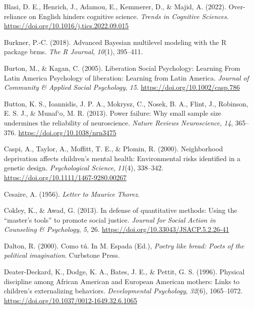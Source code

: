 \documentclass[
  letterpaper,
  DIV=11,
  numbers=noendperiod]{scrreprt}
\newlength{\cslhangindent}
\newenvironment{CSLReferences}[2] %
 {\begin{list}{}{%
  \setlength{\itemindent}{0pt}
  \setlength{\leftmargin}{0pt}
  \setlength{\parsep}{0pt}
  \ifodd #1
   \setlength{\leftmargin}{\cslhangindent}
   \setlength{\itemindent}{-1\cslhangindent}
  \fi
  \setlength{\itemsep}{#2\baselineskip}}}
 {\end{list}}
\begin{document}
\begin{CSLReferences}{1}{0}
Blasi, D. E., Henrich, J., Adamou, E., Kemmerer, D., \& Majid, A.
(2022). Over-reliance on {E}nglish hinders cognitive science.
\emph{Trends in Cognitive Sciences}.
\url{https://doi.org/10.1016/j.tics.2022.09.015}

Burkner, P.-C. (2018). Advanced {B}ayesian multilevel modeling with the
{R} package brms. \emph{The R Journal}, \emph{10}(1), 395--411.

Burton, M., \& Kagan, C. (2005). {Liberation Social Psychology: Learning
From Latin America Psychology of liberation: Learning from Latin
America}. \emph{Journal of Community \& Applied Social Psychology},
\emph{15}. \url{https://doi.org/10.1002/casp.786}

Button, K. S., Ioannidis, J. P. A., Mokrysz, C., Nosek, B. A., Flint,
J., Robinson, E. S. J., \& Munaf`o, M. R. (2013). Power failure: Why
small sample size undermines the reliability of neuroscience.
\emph{Nature Reviews Neuroscience}, \emph{14}, 365--376.
\url{https://doi.org/10.1038/nrn3475}

Caspi, A., Taylor, A., Moffitt, T. E., \& Plomin, R. (2000).
Neighborhood deprivation affects children's mental health: Environmental
risks identified in a genetic design. \emph{Psychological Science},
\emph{11}(4), 338--342. \url{https://doi.org/10.1111/1467-9280.00267}

Cesaire, A. (1956). \emph{Letter to {M}aurice {T}horez}.

Cokley, K., \& Awad, G. (2013). In defense of quantitative methods:
Using the {``master's tools''} to promote social justice. \emph{Journal
for Social Action in Counseling \& Psychology}, \emph{5}, 26.
\url{https://doi.org/10.33043/JSACP.5.2.26-41}

Dalton, R. (2000). Como t{ú}. In M. Espada (Ed.), \emph{Poetry like
bread: Poets of the political imagination}. Curbstone Press.

Deater-Deckard, K., Dodge, K. A., Bates, J. E., \& Pettit, G. S. (1996).
{Physical discipline among African American and European American
mothers: Links to children's externalizing behaviors.}
\emph{Developmental Psychology}, \emph{32}(6), 1065--1072.
\url{https://doi.org/10.1037/0012-1649.32.6.1065}


\end{CSLReferences}
\end{document}
